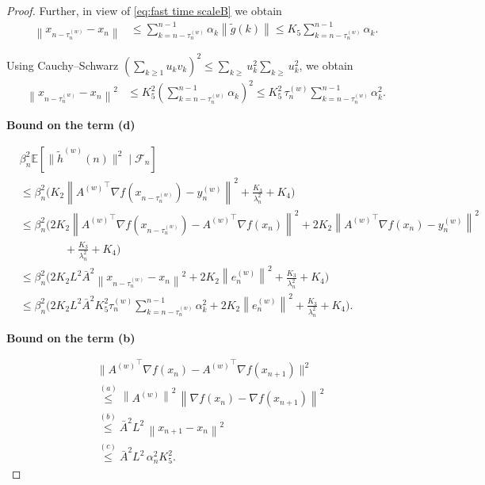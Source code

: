 \documentclass[10pt,a4paper]{amsart}
\newcommand{\norm}[1]{\left\lVert #1 \right\rVert}
\begin{document}
\begin{proof}
Further, in view of \eqref{eq:fast time scaleB} we obtain
\begin{equation*}
\begin{split}
\norm{x_{n-\tau_n^{(w)}} - x_n}
&\le \sum_{k=n-\tau_n^{(w)}}^{n-1} \alpha_k \norm{\widetilde{g}(k)} \le K_5 \sum_{k=n-\tau_n^{(w)}}^{n-1} \alpha_k.
\end{split}
\end{equation*}

Using Cauchy--Schwarz $(\sum\limits_{k \geq 1} u_k v_k)^2 \leq \sum\limits_{k \geq} u_k^2  \sum\limits_{k \geq} u_k^2$, we obtain
\begin{equation*}
\begin{split}
\norm{x_{n-\tau_n^{(w)}} - x_n}^2
&\le K_5^2
\left( \sum_{k=n-\tau_n^{(w)}}^{n-1} \alpha_k \right)^2 \le K_5^2 \, \tau_n^{(w)}
\sum_{k=n-\tau_n^{(w)}}^{n-1} \alpha_k^2.
\end{split}
\end{equation*}

\textbf{Bound on the term (d)}

\begin{equation*}
\begin{split}
& \beta_n^2
\mathbb{E}\!\left[
\|\widetilde{h}^{(w)}(n)\|^2
\mid \mathcal{F}_n
\right] \\
&\le 
\beta_n^2 \Big(
K_2 \norm{
{A^{(w)}}^\top \nabla f(x_{n-\tau_n^{(w)}})
- y_n^{(w)}
}^2
+ \frac{K_3}{\lambda_n^2}
+ K_4
\Big) \\
&\le 
\beta_n^2 \Big(
2 K_2 \norm{
{A^{(w)}}^\top \nabla f(x_{n-\tau_n^{(w)}})
- {A^{(w)}}^\top \nabla f(x_n)
}^2
+ 2 K_2 \norm{
{A^{(w)}}^\top \nabla f(x_n) - y_n^{(w)}
}^2 \\
&\qquad\qquad
+ \frac{K_3}{\lambda_n^2}
+ K_4
\Big) \\
&\le 
\beta_n^2 \Big(
2 K_2 L^2 \bar{A}^2 
\norm{x_{n-\tau_n^{(w)}} - x_n}^2
+ 2 K_2 \norm{e_n^{(w)}}^2
+ \frac{K_3}{\lambda_n^2}
+ K_4
\Big) \\
&\le 
\beta_n^2 \Big(
2 K_2 L^2 \bar{A}^2 K_5^2 \tau_n^{(w)}
\sum_{k=n-\tau_n^{(w)}}^{n-1} \alpha_k^2
+ 2 K_2 \norm{e_n^{(w)}}^2
+ \frac{K_3}{\lambda_n^2}
+ K_4
\Big).
\end{split}
\end{equation*}

\textbf{Bound on the term (b)}

\begin{equation}
\begin{split}
& \| {A^{(w)}}^\top \nabla f(x_n) - {A^{(w)}}^\top \nabla f(x_{n+1})\|^2 \\
&\overset{(a)}{\leq} \norm{A^{(w)}}^2 \, \norm{\nabla f(x_n) - \nabla f(x_{n+1})}^2 \\
&\overset{(b)}{\leq} \bar{A}^2 L^2 \, \norm{x_{n+1}-x_n}^2 \\
&\overset{(c)}{\leq} \bar{A}^2 L^2 \, \alpha_n^2 K_5^2.
\end{split}
\label{ssmothprop}
\end{equation}


\end{proof}
\end{document}
